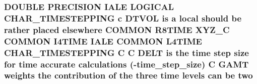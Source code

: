 \hypertarget{home_2abonfi_2_c_f_d__codes_2_eul_f_s_83_84_2include_2time_8com_aff9d488c2e656631c4112588122f2417}{
\subsubsection[{two}]{\setlength{\rightskip}{0pt plus 5cm}D\-O\-U\-B\-L\-E P\-R\-E\-C\-I\-S\-I\-O\-N I\-A\-L\-E L\-O\-G\-I\-C\-A\-L C\-H\-A\-R\-\_\-\-T\-I\-M\-E\-S\-T\-E\-P\-P\-I\-N\-G c {\bf D\-T\-V\-O\-L} is a local should be rather placed elsewhere C\-O\-M\-M\-O\-N R8\-T\-I\-M\-E {\bf X\-Y\-Z\-\_\-\-C} C\-O\-M\-M\-O\-N I4\-T\-I\-M\-E I\-A\-L\-E C\-O\-M\-M\-O\-N L4\-T\-I\-M\-E C\-H\-A\-R\-\_\-\-T\-I\-M\-E\-S\-T\-E\-P\-P\-I\-N\-G C C {\bf D\-E\-L\-T} is the time {\bf step} size for time accurate calculations (-\/time\-\_\-step\-\_\-size) C {\bf G\-A\-M\-T} weights the contribution of the three time levels can be two}}\label{home_2abonfi_2_c_f_d__codes_2_eul_f_s_83_84_2include_2time_8com_aff9d488c2e656631c4112588122f2417}
